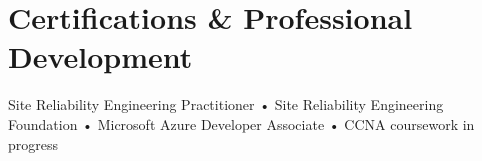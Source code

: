 \section{Certifications \& Professional Development}
    \resumeSubHeadingListStart
      
      \resumeProjectHeading
          {Site Reliability Engineering Practitioner • Site Reliability Engineering Foundation • Microsoft Azure Developer Associate • CCNA coursework in progress}{}
    \resumeSubHeadingListEnd